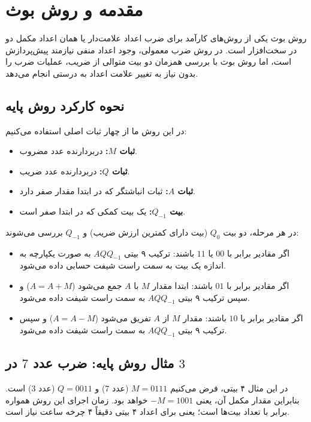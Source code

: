 \documentclass[11pt,a4paper]{article}
\begin{document}
\newpage
\tableofcontents
\newpage

\section{مقدمه و روش بوث}
روش بوث یکی از روش‌های کارآمد برای ضرب اعداد علامت‌دار یا همان اعداد مکمل دو در سخت‌افزار است. در روش ضرب معمولی، وجود اعداد منفی نیازمند پیش‌پردازش است، اما روش بوث با بررسی همزمان دو بیت متوالی از ضریب، عملیات ضرب را بدون نیاز به تغییر علامت اعداد به درستی انجام می‌دهد.

\subsection{نحوه کارکرد روش پایه}
در این روش ما از چهار ثبات اصلی استفاده می‌کنیم:
\begin{itemize}
    \item \textbf{ثبات $M$:} دربردارنده عدد مضروب.
    \item \textbf{ثبات $Q$:} دربردارنده عدد ضریب.
    \item \textbf{ثبات $A$:} ثبات انباشتگر که در ابتدا مقدار صفر دارد.
    \item \textbf{بیت $Q_{-1}$:} یک بیت کمکی که در ابتدا صفر است.
\end{itemize}

در هر مرحله، دو بیت $Q_0$ (بیت دارای کمترین ارزش ضریب) و $Q_{-1}$ بررسی می‌شوند:
\begin{itemize}
    \item اگر مقادیر برابر با $00$ یا $11$ باشند: ترکیب ۹ بیتی $A Q Q_{-1}$ به صورت یکپارچه به اندازه یک بیت به سمت راست شیفت حسابی داده می‌شود.
    \item اگر مقادیر برابر با $01$ باشند: ابتدا مقدار $M$ با $A$ جمع می‌شود ($A = A + M$) و سپس ترکیب ۹ بیتی $A Q Q_{-1}$ به سمت راست شیفت داده می‌شود.
    \item اگر مقادیر برابر با $10$ باشند: مقدار $M$ از $A$ تفریق می‌شود ($A = A - M$) و سپس ترکیب ۹ بیتی $A Q Q_{-1}$ به سمت راست شیفت داده می‌شود.
\end{itemize}

\subsection{مثال روش پایه: ضرب عدد $7$ در $3$}
در این مثال ۴ بیتی، فرض می‌کنیم $M = 0111$ (عدد $7$) و $Q = 0011$ (عدد $3$) است.
بنابراین مقدار مکمل آن، یعنی $-M = 1001$ خواهد بود. زمان اجرای این روش همواره برابر با تعداد بیت‌ها است؛ یعنی برای اعداد ۴ بیتی دقیقاً ۴ چرخه ساعت نیاز است.
\end{document}
